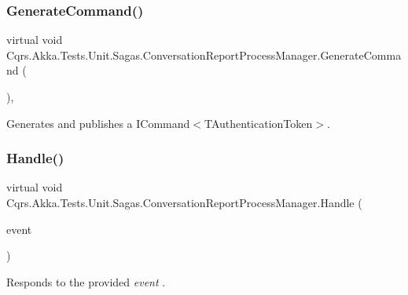 \subsubsection{\texorpdfstring{Generate\+Command()}{GenerateCommand()}}
{\footnotesize\ttfamily virtual void Cqrs.\+Akka.\+Tests.\+Unit.\+Sagas.\+Conversation\+Report\+Process\+Manager.\+Generate\+Command (\begin{DoxyParamCaption}{ }\end{DoxyParamCaption})\hspace{0.3cm}{\ttfamily [protected]}, {\ttfamily [virtual]}}



Generates and publishes a I\+Command$<$\+T\+Authentication\+Token$>$. 

\mbox{\label{classCqrs_1_1Akka_1_1Tests_1_1Unit_1_1Sagas_1_1ConversationReportProcessManager_a282356c4090cfaf2dcfa93916b8b8997_a282356c4090cfaf2dcfa93916b8b8997}} 
\subsubsection{\texorpdfstring{Handle()}{Handle()}\hspace{0.1cm}{\footnotesize\ttfamily [1/3]}}
{\footnotesize\ttfamily virtual void Cqrs.\+Akka.\+Tests.\+Unit.\+Sagas.\+Conversation\+Report\+Process\+Manager.\+Handle (\begin{DoxyParamCaption}\item[{\hyperlink{classCqrs_1_1Akka_1_1Tests_1_1Unit_1_1Events_1_1HelloWorldSaid}{Hello\+World\+Said} @}]{event }\end{DoxyParamCaption})\hspace{0.3cm}{\ttfamily [virtual]}}



Responds to the provided {\itshape event} . 


